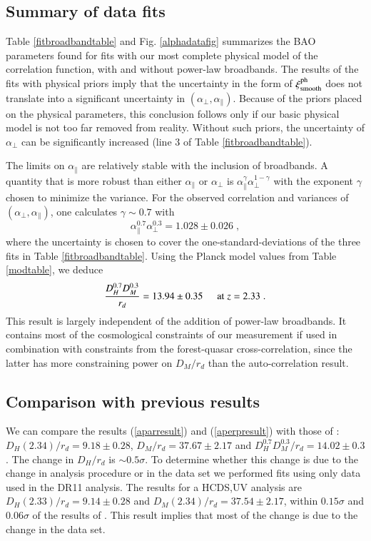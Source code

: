 \documentclass{aa}
\newcommand{\xicosmo}{\xi^{\rm ph}}
\newcommand{\apar}{\alpha_\parallel}
\newcommand{\aperp}{\alpha_\perp}
\newcommand{\DM}{D_M}
\newcommand{\DHub}{D_H}
\begin{document}
\subsection{Summary of data fits}

Table \ref{fitbroadbandtable} and Fig. \ref{alphadatafig} summarizes
the BAO parameters found for fits with our most complete physical
model of the correlation function, with and without power-law broadbands.
The results of the fits with physical priors imply  that the
uncertainty in the form of $\xicosmo_{\rm smooth}$ does not
translate into a significant uncertainty in $(\aperp,\apar)$.
Because of the priors placed on the physical parameters,
this conclusion follows only if our basic physical model is not
too far removed from reality.
Without such priors, the uncertainty of $\aperp$ can be significantly
increased (line 3 of Table \ref{fitbroadbandtable}).


The limits on $\apar$ are relatively stable with the inclusion
of broadbands.
A quantity that is more robust than
either $\apar$ or $\aperp$ is $\apar^\gamma\aperp^{1-\gamma}$ with
the exponent $\gamma$ chosen to minimize the variance.
For the observed correlation and variances of $(\aperp,\apar)$,
one calculates $\gamma\sim0.7$ with
\begin{equation}
  \apar^{0.7}\aperp^{0.3}=1.028  \pm 0.026 \;,
\end{equation}
where the uncertainty is chosen to cover the one-standard-deviations
of the three fits in Table \ref{fitbroadbandtable}.
Using the Planck model values from Table \ref{modtable}, we deduce
\begin{equation}
  \frac{\DHub^{0.7}\DM^{0.3}}{r_d} =13.94  \pm 0.35 
  \hspace*{5mm}{\rm at}\;z=2.33\;.
\end{equation}
This result is largely independent of the addition of power-law
broadbands.  It contains most of the cosmological constraints
of our measurement if used in combination with constraints
from the forest-quasar cross-correlation, since the latter
has more constraining power on $\DM/r_d$ than the auto-correlation
result.






\subsection{Comparison with previous results}

We can compare the results (\ref{aparresult}) and (\ref{aperpresult})
with those of \citet{2015A&A...574A..59D}: 
$\DHub(2.34)/r_d=9.18\pm0.28$,
$\DM/r_d=37.67\pm2.17$
and
$\DHub^{0.7}\DM^{0.3}/r_d=14.02\pm0.3$.
The change in $\DHub/r_d$ is $\sim0.5\sigma$.
To determine whether this change
is due to the change in analysis procedure
or in the data set we performed fits using only data
used in the DR11 analysis.
The results for a HCDS,UV analysis are
$\DHub(2.33)/r_d=9.14\pm0.28$ and
$\DM(2.34)/r_d=37.54\pm2.17$,
within $0.15\sigma$ and $0.06\sigma$ of the
results of \citet{2015A&A...574A..59D}.
This result implies that most of the change is due to the change
in the data set.
\end{document}

